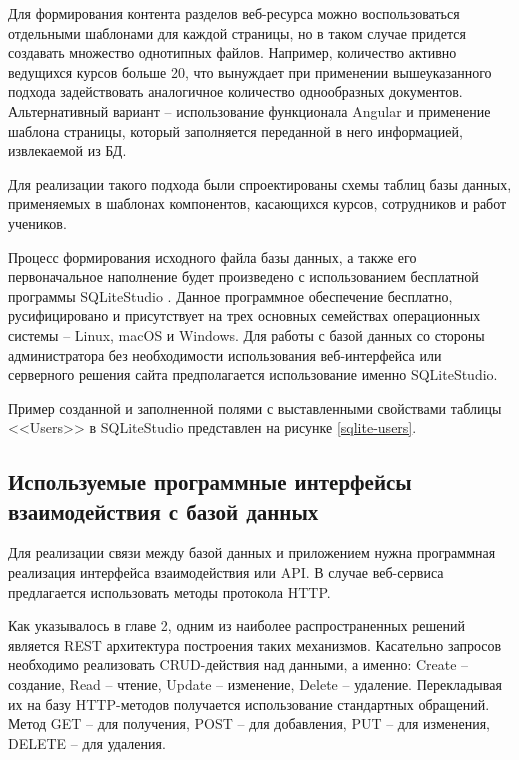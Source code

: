 Для формирования контента разделов веб-ресурса можно воспользоваться отдельными шаблонами для каждой страницы, но в таком случае придется создавать множество однотипных файлов.
Например, количество активно ведущихся курсов больше 20, что вынуждает при применении вышеуказанного подхода задействовать аналогичное количество однообразных документов.
Альтернативный вариант -- использование функционала Angular и применение шаблона страницы, который заполняется переданной в него информацией, извлекаемой из БД.

Для реализации такого подхода были спроектированы схемы таблиц базы данных, применяемых в шаблонах компонентов, касающихся курсов, сотрудников и работ учеников.

Процесс формирования исходного файла базы данных, а также его первоначальное наполнение будет произведено с использованием бесплатной программы SQLiteStudio \cite{sqlitestudio}.
Данное программное обеспечение бесплатно, русифицировано и присутствует на трех основных семействах операционных системы -- Linux, macOS и Windows.
Для работы с базой данных со стороны администратора без необходимости использования веб-интерфейса или серверного решения сайта предполагается использование именно SQLiteStudio.

Пример созданной и заполненной полями с выставленными свойствами таблицы <<Users>> в SQLiteStudio представлен на рисунке \ref{sqlite-users}.



\subsection{Используемые программные интерфейсы взаимодействия с базой данных}

Для реализации связи между базой данных и приложением нужна программная реализация интерфейса взаимодействия или API.
В случае веб-сервиса предлагается использовать методы протокола HTTP.

Как указывалось в главе 2, одним из наиболее распространенных решений является REST архитектура построения таких механизмов.
Касательно запросов необходимо реализовать CRUD-действия над данными, а именно: Create -- создание, Read -- чтение, Update -- изменение, Delete -- удаление.
Перекладывая их на базу HTTP-методов получается использование стандартных обращений.
Метод GET -- для получения, POST -- для добавления, PUT -- для изменения, DELETE -- для удаления.

